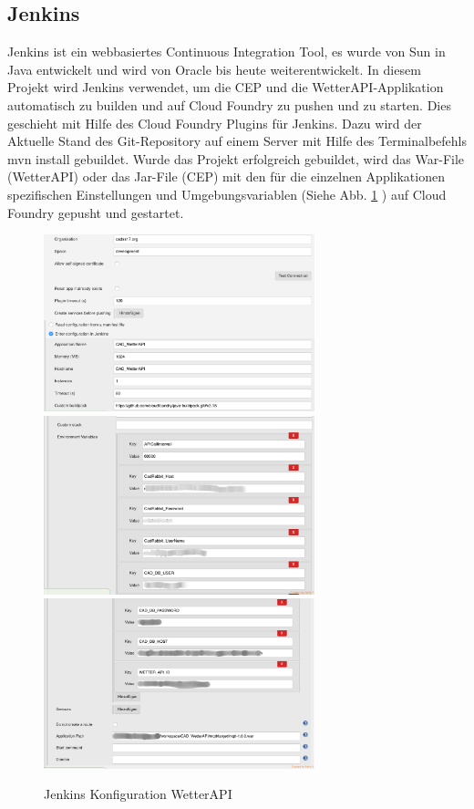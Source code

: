 \subsection{Jenkins}\label{Jenkins}
Jenkins ist ein webbasiertes Continuous Integration Tool, es wurde von Sun in Java entwickelt und wird von Oracle bis heute weiterentwickelt. In diesem Projekt wird Jenkins verwendet, um die CEP und die WetterAPI-Applikation automatisch zu builden und auf Cloud Foundry zu pushen und zu starten.
Dies geschieht mit Hilfe des Cloud Foundry Plugins für Jenkins. Dazu wird der Aktuelle Stand des Git-Repository auf einem Server mit Hilfe des Terminalbefehls mvn install gebuildet. Wurde das Projekt erfolgreich gebuildet, wird das War-File (WetterAPI) oder das Jar-File (CEP) mit den für die einzelnen Applikationen spezifischen Einstellungen und Umgebungsvariablen (Siehe Abb. \ref{img:jenkinsConf} ) auf Cloud Foundry gepusht und gestartet.
\begin{figure}[htbp]
	\centering
	\includegraphics[width=0.7\textwidth]{Bilder/JenkinsBsp1.png}
	\includegraphics[width=0.7\textwidth]{Bilder/JenkinsBsp2.png}
	\includegraphics[width=0.7\textwidth]{Bilder/JenkinsBsp3.png}
	\caption{Jenkins Konfiguration WetterAPI}
	\label{img:jenkinsConf}
\end{figure} 
